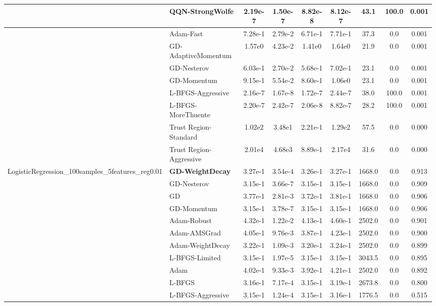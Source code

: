 \documentclass{article}
\begin{document}
\begin{longtable}{|l|l|c|c|c|c|c|c|c|}
\hline
 & QQN-StrongWolfe & 2.19e-7 & 1.50e-7 & 8.82e-8 & 8.12e-7 & 43.1 & 100.0 & 0.001 \\
\hline
 & Adam-Fast & 7.28e-1 & 2.79e-2 & 6.71e-1 & 7.71e-1 & 37.3 & 0.0 & 0.001 \\
\hline
 & GD-AdaptiveMomentum & 1.57e0 & 4.23e-2 & 1.41e0 & 1.64e0 & 21.9 & 0.0 & 0.001 \\
\hline
 & GD-Nesterov & 6.03e-1 & 2.70e-2 & 5.68e-1 & 7.02e-1 & 23.1 & 0.0 & 0.001 \\
\hline
 & GD-Momentum & 9.15e-1 & 5.54e-2 & 8.60e-1 & 1.06e0 & 23.1 & 0.0 & 0.001 \\
\hline
 & L-BFGS-Aggressive & 2.16e-7 & 1.67e-8 & 1.72e-7 & 2.44e-7 & 38.0 & 100.0 & 0.001 \\
\hline
 & L-BFGS-MoreThuente & 2.20e-7 & 2.42e-7 & 2.06e-8 & 8.82e-7 & 28.2 & 100.0 & 0.001 \\
\hline
 & Trust Region-Standard & 1.02e2 & 3.48e1 & 2.21e-1 & 1.29e2 & 57.5 & 0.0 & 0.000 \\
\hline
 & Trust Region-Aggressive & 2.01e4 & 4.68e3 & 8.89e-1 & 2.17e4 & 31.6 & 0.0 & 0.000 \\
LogisticRegression\_100samples\_5features\_reg0.01 & \textbf{GD-WeightDecay} & 3.27e-1 & 3.54e-4 & 3.26e-1 & 3.27e-1 & 1668.0 & 0.0 & 0.913 \\
\hline
 & GD-Nesterov & 3.15e-1 & 3.66e-7 & 3.15e-1 & 3.15e-1 & 1668.0 & 0.0 & 0.909 \\
\hline
 & GD & 3.77e-1 & 2.81e-3 & 3.72e-1 & 3.81e-1 & 1668.0 & 0.0 & 0.906 \\
\hline
 & GD-Momentum & 3.15e-1 & 3.78e-7 & 3.15e-1 & 3.15e-1 & 1668.0 & 0.0 & 0.906 \\
\hline
 & Adam-Robust & 4.32e-1 & 1.22e-2 & 4.13e-1 & 4.60e-1 & 2502.0 & 0.0 & 0.901 \\
\hline
 & Adam-AMSGrad & 4.05e-1 & 9.76e-3 & 3.87e-1 & 4.23e-1 & 2502.0 & 0.0 & 0.900 \\
\hline
 & Adam-WeightDecay & 3.22e-1 & 1.09e-3 & 3.20e-1 & 3.24e-1 & 2502.0 & 0.0 & 0.899 \\
\hline
 & L-BFGS-Limited & 3.15e-1 & 1.97e-5 & 3.15e-1 & 3.15e-1 & 3043.5 & 0.0 & 0.895 \\
\hline
 & Adam & 4.02e-1 & 9.33e-3 & 3.92e-1 & 4.21e-1 & 2502.0 & 0.0 & 0.892 \\
\hline
 & L-BFGS & 3.16e-1 & 7.17e-4 & 3.15e-1 & 3.19e-1 & 2673.8 & 0.0 & 0.800 \\
\hline
 & L-BFGS-Aggressive & 3.15e-1 & 1.24e-4 & 3.15e-1 & 3.16e-1 & 1776.5 & 0.0 & 0.515 \\

\end{longtable}
\end{document}
